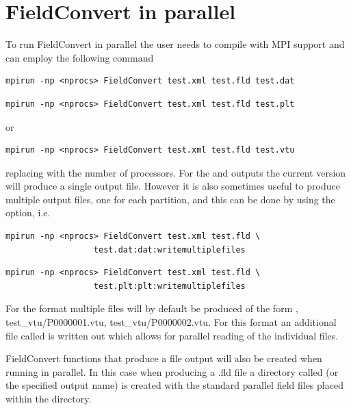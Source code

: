 \section{FieldConvert in parallel}
To run FieldConvert in parallel the user needs to compile
\nekpp with MPI support and can employ the following
command
\begin{lstlisting}[style=BashInputStyle]
mpirun -np <nprocs> FieldConvert test.xml test.fld test.dat
\end{lstlisting}
\begin{lstlisting}[style=BashInputStyle]
mpirun -np <nprocs> FieldConvert test.xml test.fld test.plt
\end{lstlisting}
or
\begin{lstlisting}[style=BashInputStyle]
mpirun -np <nprocs> FieldConvert test.xml test.fld test.vtu
\end{lstlisting}
replacing  with the number of processors. For the
 and  outputs the current version will produce
a single output file.  However it is also sometimes useful to produce
multiple output files, one for each partition, and this
can be done by using the  option, i.e.
\begin{lstlisting}[style=BashInputStyle]
  mpirun -np <nprocs> FieldConvert test.xml test.fld \
                  test.dat:dat:writemultiplefiles
\end{lstlisting}
\begin{lstlisting}[style=BashInputStyle]
  mpirun -np <nprocs> FieldConvert test.xml test.fld \
                  test.plt:plt:writemultiplefiles
\end{lstlisting}

For the  format multiple files will by default be produced
of the form , {test\_vtu/P0000001.vtu},
{test\_vtu/P0000002.vtu}. For this format an additional file called
\inltt{test.pvtu} is written out which allows for parallel reading of the
individual \inltt{.vtu} files.

FieldConvert functions that produce a  file output will
also be created when running in parallel. In this case when producing
a .fld file a directory called \inltt{test.fld} (or the specified
output name) is created with the standard parallel field files placed
within the directory.
%
%
%
